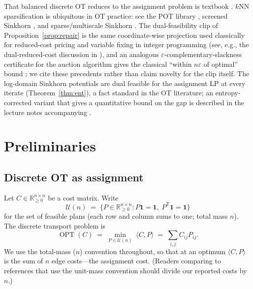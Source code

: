\documentclass[11pt]{article}
\theoremstyle{remark}
\begin{document}
That balanced discrete OT reduces to the assignment problem is textbook
\cite{birkhoff1946,schrijver2003,villani2009,peyre2019}. $k$NN
sparsification is ubiquitous in OT practice: see the POT library
\cite{flamary2021pot}, screened Sinkhorn \cite{alaya2019screenkhorn}, and
sparse/multiscale Sinkhorn \cite{schmitzer2016,schmitzer2019stable}. The
dual-feasibility clip of Proposition~\ref{prop:repair} is the same
coordinate-wise projection used classically for reduced-cost pricing and
variable fixing in integer programming (see, e.g., the dual-reduced-cost
discussion in \cite{schrijver2003}), and an
analogous $\varepsilon$-complementary-slackness certificate for the
auction algorithm gives the classical ``within $n\varepsilon$ of optimal''
bound \cite{bertsekas1992}; we cite these precedents rather than claim
novelty for the clip itself. The log-domain Sinkhorn potentials are dual
feasible for the assignment LP at every iterate (Theorem~\ref{thm:ent}), a
fact standard in the OT literature; an entropy-corrected variant that gives
a quantitative bound on the gap is described in the lecture notes
accompanying \cite{peyre2019}.\label{pg:clip}

\section{Preliminaries}
\label{sec:prelim}

\subsection{Discrete OT as assignment}
Let $C\in \mathbb{R}^{n\times n}_{\ge 0}$ be a cost matrix. Write
\[
\mathcal{U}(n) \;=\; \{P\in \mathbb{R}^{n\times n}_{\ge 0} : P\mathbf{1}=\mathbf{1},\;
P^{\mathsf T}\mathbf{1}=\mathbf{1}\}
\]
for the set of feasible plans (each row and column sums to one; total mass
$n$). The discrete transport problem is
\[
\operatorname{OPT}(C) \;=\; \min_{P\in \mathcal{U}(n)} \; \langle C,P\rangle
\;=\; \sum_{i,j} C_{ij}P_{ij}.
\]
We use the total-mass ($n$) convention throughout, so that at an optimum
$\langle C,P\rangle$ is the sum of $n$ edge costs---the assignment cost.
(Readers comparing to references that use the unit-mass convention should
divide our reported costs by $n$.)
\end{document}

